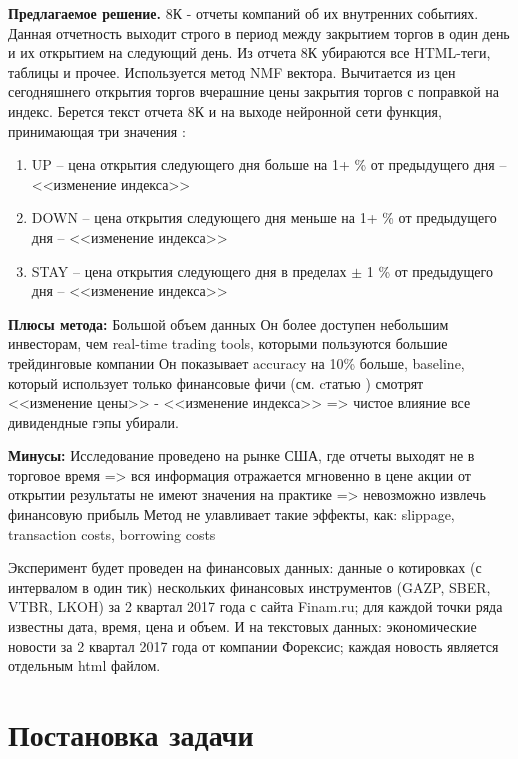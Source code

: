 \documentclass[12pt, twoside]{article}
\begin{document}
\textbf{Предлагаемое решение.}
8К - отчеты компаний об их внутренних событиях. Данная отчетность выходит строго в период между закрытием торгов в один день и их открытием на следующий день.
Из отчета 8К убираются все HTML-теги, таблицы и прочее.
Используется метод NMF вектора.
Вычитается из цен сегодняшнего открытия торгов вчерашние цены закрытия торгов с поправкой на индекс.
Берется текст отчета 8К и на выходе нейронной сети функция, принимающая три значения :
\begin{enumerate}
\item UP -- цена открытия следующего дня больше на 1+ \% от предыдущего дня -- <<изменение индекса>>
\item DOWN -- цена открытия следующего дня меньше на 1+ \% от предыдущего дня -- <<изменение индекса>>
\item STAY -- цена открытия следующего дня в пределах $\pm$ 1 \% от предыдущего дня -- <<изменение индекса>>
\end{enumerate} 

\textbf{Плюсы метода:}
Большой объем данных
Он более доступен небольшим инвесторам, чем real-time trading tools, которыми пользуются большие трейдинговые компании
Он показывает accuracy на 10\% больше, baseline, который использует только финансовые фичи (см. cтатью \cite{conf/lrec/LeeSMJ14}) 
смотрят <<изменение цены>> - <<изменение индекса>> => чистое влияние
все дивидендные гэпы убирали.

\textbf{Минусы:}
Исследование проведено на рынке США, где отчеты выходят не в торговое время => вся информация отражается мгновенно в цене акции от открытии
результаты не имеют значения на практике => невозможно извлечь финансовую прибыль
Метод не улавливает такие эффекты, как: slippage, transaction costs, borrowing costs

Эксперимент будет проведен на финансовых данных: данные о котировках (с интервалом в один тик) нескольких финансовых инструментов (GAZP, SBER, VTBR, LKOH) за 2 квартал 2017 года с сайта Finam.ru; для каждой точки ряда известны дата, время, цена и объем. И на текстовых данных: экономические новости за 2 квартал 2017 года от компании Форексис; каждая новость является отдельным html файлом.

\section{Постановка задачи}
\end{document}
